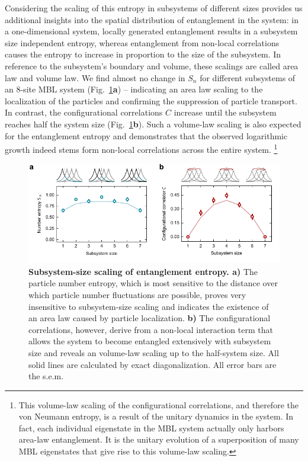Considering the scaling of this entropy in subsystems of different sizes provides us additional insights into the spatial distribution of entanglement in the system: in a one-dimensional system, locally generated entanglement results in a subsystem size independent entropy, whereas entanglement from non-local correlations causes the entropy to increase in proportion to the size of the subsystem. In reference to the subsystem's boundary and volume, these scalings are called area law and volume law. We find almost no change in $S_n$ for different subsystems of an $8$-site MBL system (Fig.~\ref{fig:ch5fig5}\textbf{a}) -- indicating an area law scaling to the localization of the particles and confirming the suppression of particle transport. In contrast, the configurational correlations $C$ increase until the subsystem reaches half the system size (Fig.~\ref{fig:ch5fig5}\textbf{b}). Such a volume-law scaling is also expected for the entanglement entropy and demonstrates that the observed logarithmic growth indeed stems form non-local correlations across the entire system. \footnote{This volume-law scaling of the configurational correlations, and therefore the von Neumann entropy, is a result of the unitary dynamics in the system. In fact, each individual eigenstate in the MBL system actually only harbors area-law entanglement. It is the unitary evolution of a superposition of many MBL eigenstates that give rise to this volume-law scaling.}

\begin{figure}[t!]
		\includegraphics[width=\columnwidth]{figures/ch5/figure5_edit.pdf} 
		\caption{\textbf{Subsystem-size scaling of entanglement entropy. a)} The particle number entropy, which is most sensitive to the distance over which particle number fluctuations are possible, proves very insensitive to subsystem-size scaling and indicates the existence of an area law caused by particle localization. \textbf{b)} The configurational correlations, however, derive from a non-local interaction term that allows the system to become entangled extensively with subsystem size and reveals an volume-law scaling up to the half-system size. All solid lines are calculated by exact diagonalization. All error bars are the s.e.m.}
		\label{fig:ch5fig5}	
\end{figure}

